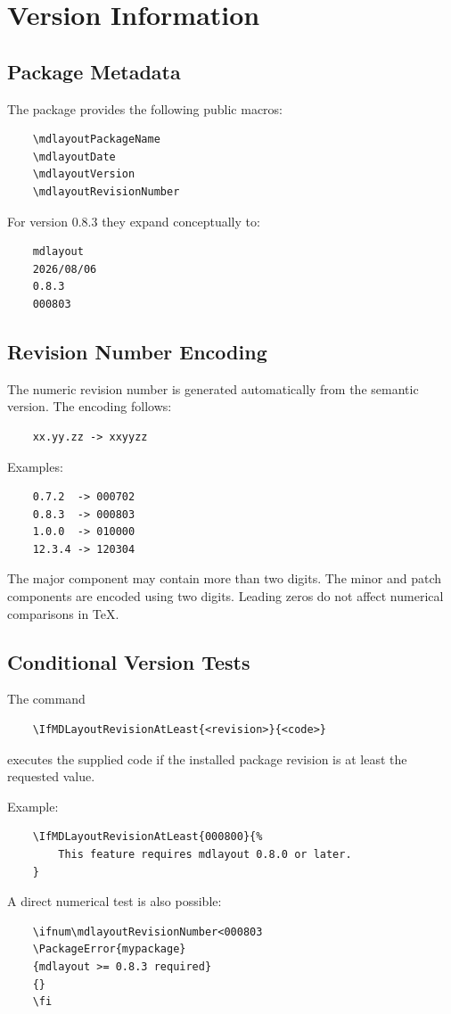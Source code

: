 \documentclass[
11pt,
a4paper,
oneside
]{scrbook}
\begin{document}
\chapter{Version Information}
\label{chap:version-information}

\section{Package Metadata}

The package provides the following public macros:
\begin{verbatim}
	\mdlayoutPackageName
	\mdlayoutDate
	\mdlayoutVersion
	\mdlayoutRevisionNumber
\end{verbatim}
For version 0.8.3 they expand conceptually to:
\begin{verbatim}
	mdlayout
	2026/08/06
	0.8.3
	000803
\end{verbatim}

\section{Revision Number Encoding}

The numeric revision number is generated automatically from the semantic
version.
The encoding follows:
\begin{verbatim}
	xx.yy.zz -> xxyyzz
\end{verbatim}
Examples:
\begin{verbatim}
	0.7.2  -> 000702
	0.8.3  -> 000803
	1.0.0  -> 010000
	12.3.4 -> 120304
\end{verbatim}
The major component may contain more than two digits.
The minor and patch components are encoded using two digits.
Leading zeros do not affect numerical comparisons in TeX.
\section{Conditional Version Tests}

The command
\begin{verbatim}
	\IfMDLayoutRevisionAtLeast{<revision>}{<code>}
\end{verbatim}
executes the supplied code if the installed package revision is at least the
requested value.

\noindent Example:
\begin{verbatim}
	\IfMDLayoutRevisionAtLeast{000800}{%
		This feature requires mdlayout 0.8.0 or later.
	}
\end{verbatim}
A direct numerical test is also possible:
\begin{verbatim}
	\ifnum\mdlayoutRevisionNumber<000803
	\PackageError{mypackage}
	{mdlayout >= 0.8.3 required}
	{}
	\fi
\end{verbatim}
\end{document}
